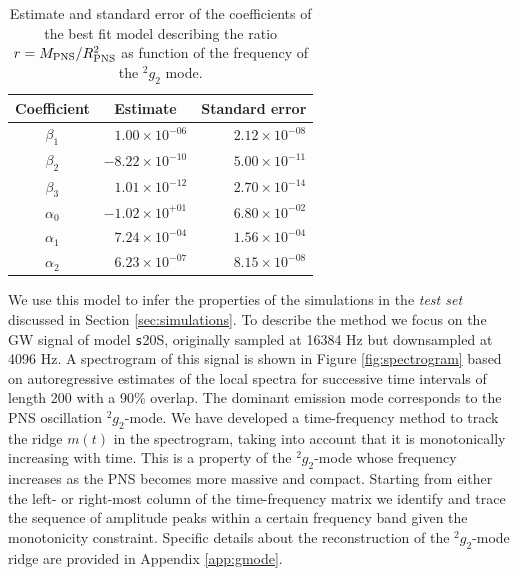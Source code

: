 
\begin{table}[h]

  \begin{tabular}{crr}
    \hline
    Coefficient & \multicolumn{1}{c}{Estimate} & Standard error \\
    \hline
   $\beta_1$  &  $ 1.00 \times 10^{-06}$ & $2.12 \times 10^{-08}$ \\   
   $\beta_2$  &  $-8.22 \times 10^{-10}$ & $5.00 \times 10^{-11}$ \\
   $\beta_3$  &  $ 1.01 \times 10^{-12}$ & $2.70 \times 10^{-14}$ \\
   $\alpha_0$ &  $-1.02 \times 10^{+01}$ & $6.80 \times 10^{-02}$ \\
   $\alpha_1$ &  $ 7.24 \times 10^{-04}$ & $1.56 \times 10^{-04}$ \\
   $\alpha_2$ &  $ 6.23 \times 10^{-07}$ & $8.15 \times 10^{-08}$ \\   
    \hline
  \end{tabular}
\caption{Estimate and standard error of the coefficients of the best fit model describing the ratio $r=M_{\rm PNS}/R_{\rm PNS}^2$ as function of the frequency of the $\mbox{}^2g_2$ mode.}\label{tab:model}
\end{table}



{We use this model to infer the properties of the simulations in the 
{\it test set} discussed in Section \ref{sec:simulations}.}
To describe the method we focus on the GW signal
of model {\texttt s20S}, originally
sampled at 16384 Hz but downsampled at 4096 Hz.
A spectrogram of this signal is shown in Figure \ref{fig:spectrogram} based on
autoregressive estimates  of the local spectra for successive time intervals of 
length 200 with a 90\% overlap.
The dominant emission mode corresponds to the PNS oscillation $\mbox{}^2 g_2$-mode. We have
developed a time-frequency method to track the ridge $m(t) $ in the spectrogram,
taking into account that it is monotonically increasing with time. 
This is a property of the $\mbox{}^2 g_2$-mode whose frequency   
increases as the PNS becomes more massive and compact.
Starting from either the left- or right-most column of the time-frequency matrix
we identify and trace the sequence of amplitude peaks within a certain frequency
band given the monotonicity constraint. Specific details about the reconstruction of the $\mbox{}^2 g_2$-mode ridge 
are provided in Appendix \ref{app:gmode}. 

